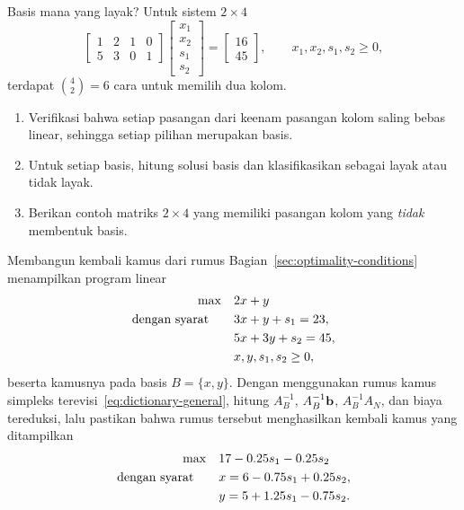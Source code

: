 \begin{ex}{Basis mana yang layak?}{}
\label{ex:matrix-feasible-bases}
 Untuk sistem \( 2 \times 4 \)
\[
\begin{bmatrix}
    1 & 2 & 1 & 0 \\
    5 & 3 & 0 & 1
\end{bmatrix}
\begin{bmatrix}
    x_1 \\ x_2 \\ s_1 \\ s_2
\end{bmatrix}
=
\begin{bmatrix}
    16 \\ 45
\end{bmatrix},
\qquad x_1, x_2, s_1, s_2 \geq 0,
\]
terdapat \( \binom{4}{2} = 6 \) cara untuk memilih dua kolom.
\begin{enumerate}
    \item Verifikasi bahwa setiap pasangan dari keenam pasangan kolom saling bebas linear, sehingga setiap pilihan merupakan basis.
    \item Untuk setiap basis, hitung solusi basis dan klasifikasikan sebagai layak atau tidak layak.
    \item Berikan contoh matriks \( 2 \times 4 \) yang memiliki pasangan kolom yang \emph{tidak} membentuk basis.
\end{enumerate}
\end{ex}

\begin{ex}{Membangun kembali kamus dari rumus}{}
\label{ex:matrix-dictionary-formula}
 Bagian~\ref{sec:optimality-conditions} menampilkan program linear
\[
\begin{aligned}
\max\quad & 2x + y \\
\mbox{dengan syarat}\quad\quad & 3x + y + s_1 = 23,\\
& 5x + 3y + s_2 = 45,\\
& x, y, s_1, s_2 \ge 0,
\end{aligned}
\]
beserta kamusnya pada basis \( B = \{x, y\} \).  Dengan menggunakan rumus kamus simpleks terevisi~\eqref{eq:dictionary-general}, hitung \( A_B^{-1} \), \( A_B^{-1}\mathbf{b} \), \( A_B^{-1}A_N \), dan biaya tereduksi, lalu pastikan bahwa rumus tersebut menghasilkan kembali kamus yang ditampilkan
\[
\begin{aligned}
\max\quad & 17 - 0.25s_1 - 0.25s_2 \\
\mbox{dengan syarat}\quad\quad & x = 6 - 0.75s_1 + 0.25s_2,\\
& y = 5 + 1.25s_1 - 0.75s_2.
\end{aligned}
\]
\exrefs{\S\ref{sec:optimality-conditions}}
\end{ex}

